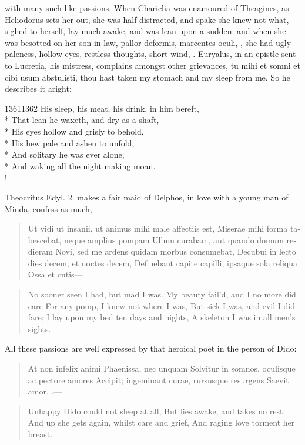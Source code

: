 with many such like passions. When Chariclia was enamoured of
Theagines, as Heliodorus sets her out, she was half distracted,
and spake she knew not what, sighed to herself, lay much awake, and was
lean upon a sudden: and when she was besotted on her son-in-law,
pallor deformis, marcentes oculi, \etc{}, she had ugly paleness,
hollow eyes, restless thoughts, short wind, \etc{}. Euryalus, in an epistle
sent to Lucretia, his mistress, complains amongst other grievances, tu
mihi et somni et cibi usum abstulisti, thou hast taken my stomach and
my sleep from me. So he describes it aright:
%
{\gothfont%
\begin{versewithlinenos}{2}{1361}{1362}%
His sleep, his meat, his drink, in him bereft,\\*
That lean he waxeth, and dry as a shaft,\\*
His eyes hollow and grisly to behold,\\*
His hew pale and ashen to unfold,\\*
And solitary he was ever alone,\\*
And waking all the night making moan.\\!
\end{versewithlinenos}%
}%

Theocritus Edyl. 2. makes a fair maid of Delphos, in love with a young
man of Minda, confess as much,

\begin{latin}
\begin{verse}
Ut vidi ut insanii, ut animus mihi male affectiis est,
Miserae mihi forma tabescebat, neque amplius pompam
Ullum curabam, aut quando domum redieram
Novi, sed me ardens quidam morbus consumebat,
Decubui in lecto dies decem, et noctes decem,
Defluebant capite capilli, ipsaque sola reliqua
Ossa et cutis---
\end{verse}
\end{latin}
\translationrule%
\begin{verse}%
No sooner seen I had, but mad I was.
My beauty fail'd, and I no more did care
For any pomp, I knew not where I was,
But sick I was, and evil I did fare;
I lay upon my bed ten days and nights,
A skeleton I was in all men's sights.
\end{verse}%

All these passions are well expressed by that heroical poet in
the person of Dido:

\begin{latin}
\begin{verse}
At non infelix animi Phaenissa, nec unquam
Solvitur in somnos, oculisque ac pectore amores
Accipit; ingeminant curae, rursusque resurgens
Saevit amor, \etc{}.---
\end{verse}
\end{latin}
\translationrule%
\begin{verse}%
Unhappy Dido could not sleep at all,
But lies awake, and takes no rest:
And up she gets again, whilst care and grief,
And raging love torment her breast.
\end{verse}%

